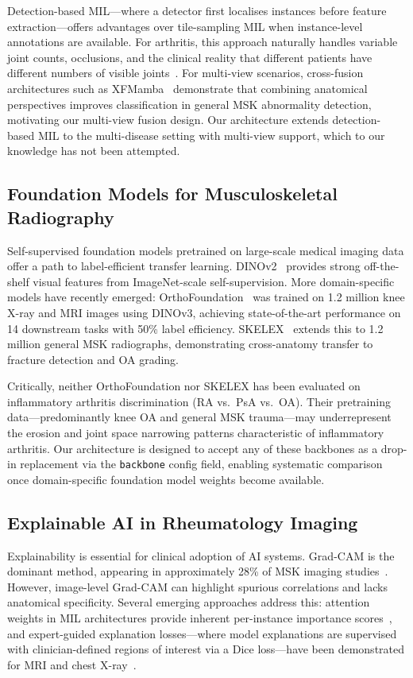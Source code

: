 \documentclass{article}
\begin{document}
Detection-based MIL---where a detector first localises instances before feature extraction---offers advantages over tile-sampling MIL when instance-level annotations are available. For arthritis, this approach naturally handles variable joint counts, occlusions, and the clinical reality that different patients have different numbers of visible joints~\cite{scirep2025}. For multi-view scenarios, cross-fusion architectures such as XFMamba~\cite{carion2025} demonstrate that combining anatomical perspectives improves classification in general MSK abnormality detection, motivating our multi-view fusion design. Our architecture extends detection-based MIL to the multi-disease setting with multi-view support, which to our knowledge has not been attempted.

\subsection{Foundation Models for Musculoskeletal Radiography}
Self-supervised foundation models pretrained on large-scale medical imaging data offer a path to label-efficient transfer learning. DINOv2~\cite{dinov22023} provides strong off-the-shelf visual features from ImageNet-scale self-supervision. More domain-specific models have recently emerged: OrthoFoundation~\cite{orthofoundation2026} was trained on 1.2 million knee X-ray and MRI images using DINOv3, achieving state-of-the-art performance on 14 downstream tasks with 50\% label efficiency. SKELEX~\cite{skelex2026} extends this to 1.2 million general MSK radiographs, demonstrating cross-anatomy transfer to fracture detection and OA grading.

Critically, neither OrthoFoundation nor SKELEX has been evaluated on inflammatory arthritis discrimination (RA vs.\ PsA vs.\ OA). Their pretraining data---predominantly knee OA and general MSK trauma---may underrepresent the erosion and joint space narrowing patterns characteristic of inflammatory arthritis. Our architecture is designed to accept any of these backbones as a drop-in replacement via the \texttt{backbone} config field, enabling systematic comparison once domain-specific foundation model weights become available.

\subsection{Explainable AI in Rheumatology Imaging}
Explainability is essential for clinical adoption of AI systems. Grad-CAM is the dominant method, appearing in approximately 28\% of MSK imaging studies~\cite{semin_arthritis2025}. However, image-level Grad-CAM can highlight spurious correlations and lacks anatomical specificity. Several emerging approaches address this: attention weights in MIL architectures provide inherent per-instance importance scores~\cite{bo2025}, and expert-guided explanation losses---where model explanations are supervised with clinician-defined regions of interest via a Dice loss---have been demonstrated for MRI and chest X-ray~\cite{uddin2025}.
\end{document}
